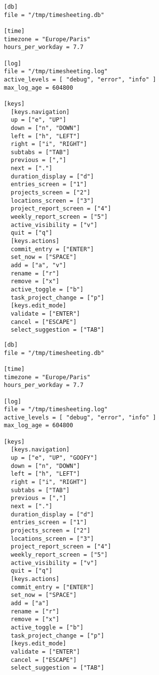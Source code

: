 \begin{minipage}{\linewidth}
  \begin{lstlisting}[caption={timesheeting configuration file
                              with duplicate binding},
                     label={lst:config_file_duplicate}]
[db]
file = "/tmp/timesheeting.db"

[time]
timezone = "Europe/Paris"
hours_per_workday = 7.7

[log]
file = "/tmp/timesheeting.log"
active_levels = [ "debug", "error", "info" ]
max_log_age = 604800

[keys]
  [keys.navigation]
  up = ["e", "UP"]
  down = ["n", "DOWN"]
  left = ["h", "LEFT"]
  right = ["i", "RIGHT"]
  subtabs = ["TAB"]
  previous = [","]
  next = ["."]
  duration_display = ["d"]
  entries_screen = ["1"]
  projects_screen = ["2"]
  locations_screen = ["3"]
  project_report_screen = ["4"]
  weekly_report_screen = ["5"]
  active_visibility = ["v"]
  quit = ["q"]
  [keys.actions]
  commit_entry = ["ENTER"]
  set_now = ["SPACE"]
  add = ["a", "v"]
  rename = ["r"]
  remove = ["x"]
  active_toggle = ["b"]
  task_project_change = ["p"]
  [keys.edit_mode]
  validate = ["ENTER"]
  cancel = ["ESCAPE"]
  select_suggestion = ["TAB"]
\end{lstlisting} \end{minipage}

\begin{minipage}{\linewidth}
  \begin{lstlisting}[caption={timesheeting configuration file with invalid
                              special key},
                     label={lst:config_file_invalidstr}]
[db]
file = "/tmp/timesheeting.db"

[time]
timezone = "Europe/Paris"
hours_per_workday = 7.7

[log]
file = "/tmp/timesheeting.log"
active_levels = [ "debug", "error", "info" ]
max_log_age = 604800

[keys]
  [keys.navigation]
  up = ["e", "UP", "GOOFY"]
  down = ["n", "DOWN"]
  left = ["h", "LEFT"]
  right = ["i", "RIGHT"]
  subtabs = ["TAB"]
  previous = [","]
  next = ["."]
  duration_display = ["d"]
  entries_screen = ["1"]
  projects_screen = ["2"]
  locations_screen = ["3"]
  project_report_screen = ["4"]
  weekly_report_screen = ["5"]
  active_visibility = ["v"]
  quit = ["q"]
  [keys.actions]
  commit_entry = ["ENTER"]
  set_now = ["SPACE"]
  add = ["a"]
  rename = ["r"]
  remove = ["x"]
  active_toggle = ["b"]
  task_project_change = ["p"]
  [keys.edit_mode]
  validate = ["ENTER"]
  cancel = ["ESCAPE"]
  select_suggestion = ["TAB"]
\end{lstlisting} \end{minipage}

